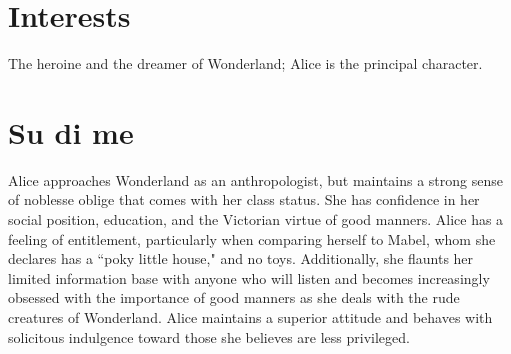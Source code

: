 \documentclass[a4paper]{twentysecondcv} %
\begin{document}

\section{Interests}

The heroine and the dreamer of Wonderland; Alice is the principal character.



\section{Su di me}

Alice approaches Wonderland as an anthropologist, but maintains a strong sense of noblesse oblige that comes with her class status. She has confidence in her social position, education, and the Victorian virtue of good manners. Alice has a feeling of entitlement, particularly when comparing herself to Mabel, whom she declares has a ``poky little house," and no toys. Additionally, she flaunts her limited information base with anyone who will listen and becomes increasingly obsessed with the importance of good manners as she deals with the rude creatures of Wonderland. Alice maintains a superior attitude and behaves with solicitous indulgence toward those she believes are less privileged.




\end{document}
